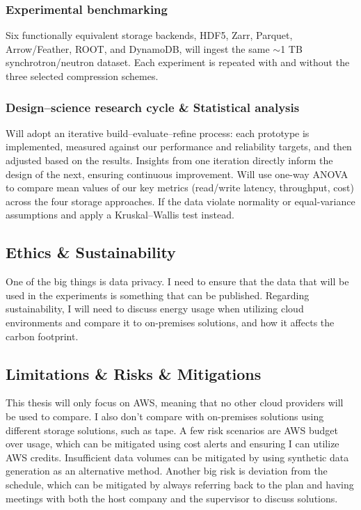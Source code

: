 \documentclass{article}
\begin{document}
\subsubsection{Experimental benchmarking}
Six functionally equivalent storage backends, HDF5, Zarr, Parquet, Arrow/Feather, ROOT, and DynamoDB, will ingest the same $\sim$1 TB synchrotron/neutron dataset. Each experiment is repeated with and without the three selected compression schemes.


\subsubsection{Design–science research cycle \& Statistical analysis}
Will adopt an iterative build–evaluate–refine process: each prototype is implemented, measured against our performance and reliability targets, and then adjusted based on the results. Insights from one iteration directly inform the design of the next, ensuring continuous improvement. Will use one-way ANOVA to compare mean values of our key metrics (read/write latency, throughput, cost) across the four storage approaches. If the data violate normality or equal-variance assumptions and apply a Kruskal–Wallis test instead.



\subsection{Ethics \& Sustainability}
One of the big things is data privacy. I need to ensure that the data that will be used in the experiments is something that can be published. Regarding sustainability, I will need to discuss energy usage when utilizing cloud environments and compare it to on-premises solutions, and how it affects the carbon footprint.

\subsection{Limitations \& Risks \& Mitigations}
This thesis will only focus on AWS, meaning that no other cloud providers will be used to compare. I also don't compare with on-premises solutions using different storage solutions, such as tape. A few risk scenarios are AWS budget over usage, which can be mitigated using cost alerts and ensuring I can utilize AWS credits. Insufficient data volumes can be mitigated by using synthetic data generation as an alternative method. Another big risk is deviation from the schedule, which can be mitigated by always referring back to the plan and having meetings with both the host company and the supervisor to discuss solutions. 
\end{document}
